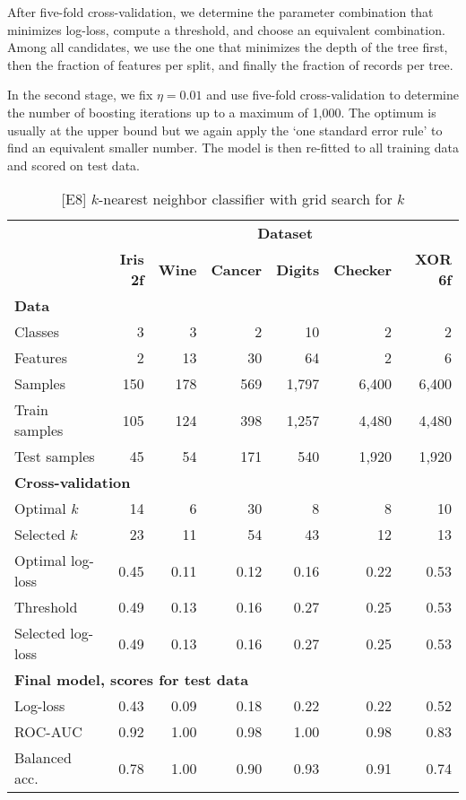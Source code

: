 %
After five-fold cross-validation, we determine the parameter combination that minimizes log-loss, compute a threshold, and choose an equivalent combination.
Among all candidates, we use the one that minimizes the depth of the tree first, then the fraction of features per split, and finally the fraction of records per tree.\par
%
In the second stage, we fix $\eta=0.01$ and use five-fold cross-validation to determine the number of boosting iterations up to a maximum of 1,000.
The optimum is usually at the upper bound but we again apply the `one standard error rule' to find an equivalent smaller number.
The model is then re-fitted to all training data and scored on test data.\par
%
\begin{table}
\caption{[E8] $k$-nearest neighbor classifier with grid search for $k$}
\label{tab_e8}
%
\begin{center}
\small
\begin{tabular}{|lrrrrrr|}
\hline
&\multicolumn{6}{c|}{\textbf{\hrulefill\ Dataset \hrulefill}}\\
&\textbf{Iris 2f}&\textbf{Wine}&\textbf{Cancer}&\textbf{Digits}&\textbf{Checker}&\textbf{XOR 6f}\\
\multicolumn{7}{|l|}{\textbf{Data}}\\
Classes&3&3&2&10&2&2\\
Features&2&13&30&64&2&6\\
Samples&150&178&569&1,797&6,400&6,400\\
Train samples&105&124&398&1,257&4,480&4,480\\
Test samples&45&54&171&540&1,920&1,920\\
\multicolumn{7}{|l|}{\textbf{Cross-validation}}\\
Optimal $k$&14&6&30&8&8&10\\
Selected $k$&23&11&54&43&12&13\\
Optimal log-loss&0.45&0.11&0.12&0.16&0.22&0.53\\
Threshold&0.49&0.13&0.16&0.27&0.25&0.53\\
Selected log-loss&0.49&0.13&0.16&0.27&0.25&0.53\\
\multicolumn{7}{|l|}{\textbf{Final model, scores for test data}}\\
Log-loss&0.43&0.09&0.18&0.22&0.22&0.52\\
ROC-AUC&0.92&1.00&0.98&1.00&0.98&0.83\\
Balanced acc.&0.78&1.00&0.90&0.93&0.91&0.74\\
\hline
\end{tabular}
\end{center}
\end{table}
